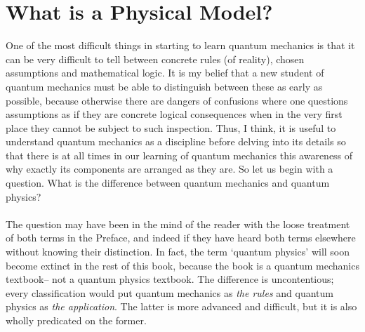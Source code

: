 \section{What is a Physical Model?}
One of the most difficult things in starting to learn quantum mechanics is that it can be very difficult to tell between concrete rules (of reality), chosen assumptions and mathematical logic. It is my belief that a new student of quantum mechanics must be able to distinguish between these as early as possible, because otherwise there are dangers of confusions where one questions assumptions as if they are concrete logical consequences when in the very first place they cannot be subject to such inspection. Thus, I think, it is useful to understand quantum mechanics as a discipline before delving into its details so that there is at all times in our learning of quantum mechanics this awareness of why exactly its components are arranged as they are. So let us begin with a question. What is the difference between quantum mechanics and quantum physics?
\\\\
The question may have been in the mind of the reader with the loose treatment of both terms in the Preface, and indeed if they have heard both terms elsewhere without knowing their distinction. In fact, the term `quantum physics' will soon become extinct in the rest of this book, because the book is a quantum mechanics textbook-- not a quantum physics textbook. The difference is uncontentious; every classification would put quantum mechanics as \textit{the rules} and quantum physics as \textit{the application}. The latter is more advanced and difficult, but it is also wholly predicated on the former. 
\\\\

